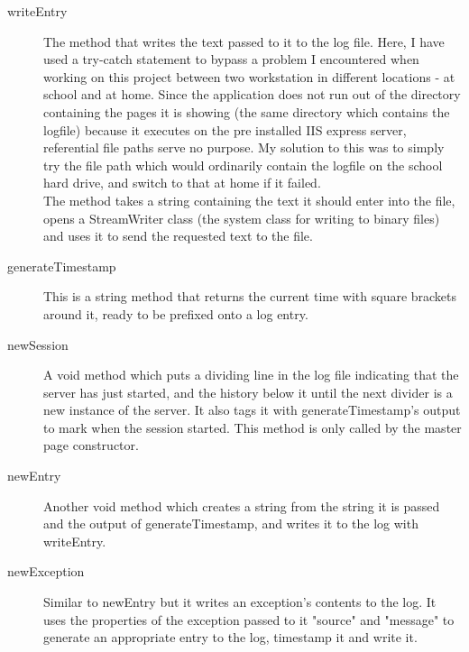 ﻿\documentclass{article}
\begin{document}
    \begin{description}
        \item[writeEntry] The method that writes the text passed to it to the log file.
        Here, I have used a try-catch statement to bypass a problem I encountered when working on this project between two workstation in different locations - at school and at home.
        Since the application does not run out of the directory containing the pages it is showing (the same directory which contains the logfile) because it executes on the pre installed IIS express server, referential file paths serve no purpose.
        My solution to this was to simply try the file path which would ordinarily contain the logfile on the school hard drive, and switch to that at home if it failed.
        \\
        The method takes a string containing the text it should enter into the file, opens a StreamWriter class (the system class for writing to binary files) and uses it to send the requested text to the file.
        \item[generateTimestamp] This is a string method that returns the current time with square brackets around it, ready to be prefixed onto a log entry.
        \item[newSession] A void method which puts a dividing line in the log file indicating that the server has just started, and the history below it until the next divider is a new instance of the server.
        It also tags it with generateTimestamp's output to mark when the session started.
        This method is only called by the master page constructor.
        \item[newEntry] Another void method which creates a string from the string it is passed and the output of generateTimestamp, and writes it to the log with writeEntry.
        \item[newException] Similar to newEntry but it writes an exception's contents to the log.
        It uses the properties of the exception passed to it "source" and "message" to generate an appropriate entry to the log, timestamp it and write it.
    \end{description}
\end{document}
